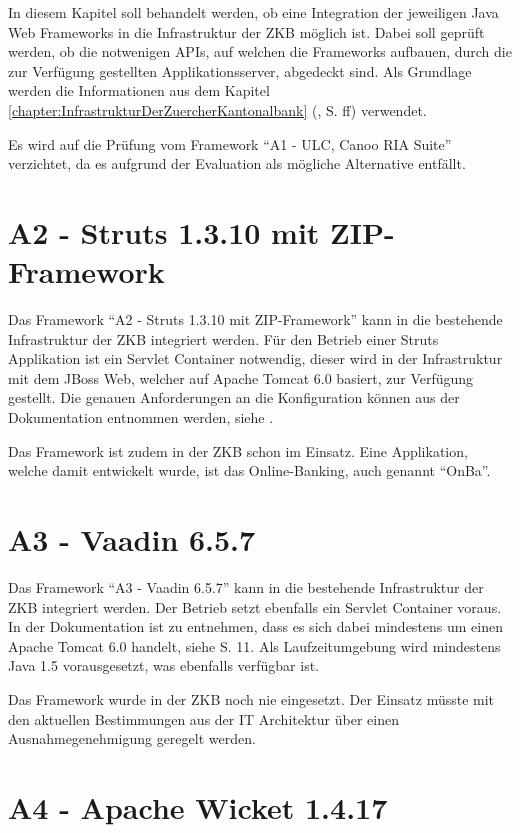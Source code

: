 In diesem Kapitel soll behandelt werden, ob eine Integration der jeweiligen Java
Web Frameworks in die Infrastruktur der \ac{ZKB} möglich ist. Dabei soll geprüft
werden, ob die notwenigen \acp{API}, auf welchen die Frameworks aufbauen, durch
die zur Verfügung gestellten Applikationsserver, abgedeckt sind. Als Grundlage
werden die Informationen aus dem Kapitel
\ref{chapter:InfrastrukturDerZuercherKantonalbank}
(, S.
\pageref{chapter:InfrastrukturDerZuercherKantonalbank}ff) verwendet.

Es wird auf die Prüfung vom Framework ``A1 - ULC, Canoo RIA Suite'' verzichtet,
da es aufgrund der Evaluation als mögliche Alternative entfällt.

\section{A2 - Struts 1.3.10 mit ZIP-Framework}

Das Framework ``A2 - Struts 1.3.10 mit ZIP-Framework'' kann in die bestehende
Infrastruktur der \ac{ZKB} integriert werden. Für den Betrieb einer Struts
Applikation ist ein Servlet Container notwendig, dieser wird in der
Infrastruktur mit dem JBoss Web, welcher auf Apache Tomcat 6.0 basiert, zur
Verfügung gestellt. Die genauen Anforderungen an die Konfiguration können aus
der Dokumentation entnommen werden, siehe \cite{StrutsDokumentation}.

Das Framework ist zudem in der \ac{ZKB} schon im Einsatz. Eine Applikation,
welche damit entwickelt wurde, ist das Online-Banking, auch genannt ``OnBa''.

\section{A3 - Vaadin 6.5.7}

Das Framework ``A3 - Vaadin 6.5.7'' kann in die bestehende
Infrastruktur der \ac{ZKB} integriert werden. Der Betrieb setzt ebenfalls ein
Servlet Container voraus. In der Dokumentation ist zu entnehmen, dass es sich
dabei mindestens um einen Apache Tomcat 6.0 handelt, siehe \cite{BookOfVaadin}
S. 11. Als Laufzeitumgebung wird mindestens Java 1.5 vorausgesetzt, was
ebenfalls verfügbar ist.

Das Framework wurde in der \ac{ZKB} noch nie eingesetzt. Der Einsatz müsste mit
den aktuellen Bestimmungen aus der IT Architektur über einen Ausnahmegenehmigung
geregelt werden.

\section{A4 - Apache Wicket 1.4.17}

